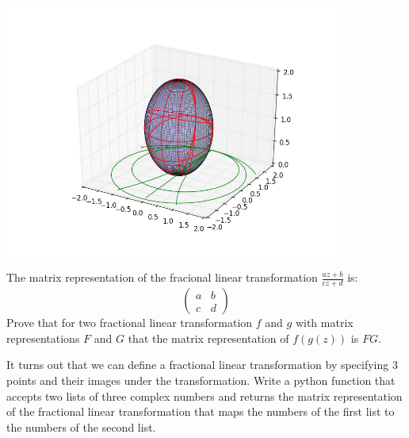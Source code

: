 \includegraphics[width=110mm]{mobius5.png}

\begin{problem}
The matrix representation of the fracional linear transformation $\frac{az+b}{cz+d}$ is:
\[
\begin{pmatrix}
a&b\\
c&d
\end{pmatrix}
\]
Prove that for two fractional linear transformation $f$ and $g$ with matrix representations $F$ and $G$ that the matrix representation of $f(g(z))$ is $FG$.
\end{problem}

\begin{problem}
It turns out that we can define a fractional linear transformation by specifying 3 points and their images under the transformation.
Write a python function that accepts two lists of three complex numbers and returns the matrix representation of the fractional linear transformation that maps the numbers of the first list to the numbers of the second list.
\end{problem}
